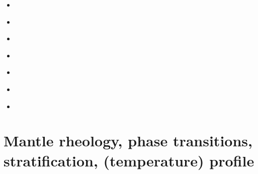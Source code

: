 \begin{scriptsize}
\begin{itemize}
\textcite{zhru15} 
\textcite{wegg15} 
\textcite{bect15} 
\textcite{pesw15} 
\textcite{khfh15} 
\item[\twothousandsixteen]   
\textcite{frbs16}
\textcite{boba16} 
\textcite{wele16} 
\textcite{welm16} 
\textcite{vade16} 
\textcite{chah16} 
\textcite{woso16b} 
\item[\twothousandseventeen] 
\textcite{badw17} 
\textcite{ghts17} 
\textcite{civj17} 
\item[\twothousandeighteen] 
\textcite{guld18} 
\textcite{arcf18} 
\textcite{wele18} 
\item[\twothousandnineteen] 
\textcite{gult19} 
\textcite{mazh19} 
\textcite{cohf19} 
\textcite{lewh19} 
\textcite{ulcw19} 
\textcite{boba19} 
\textcite{fube19} 
\textcite{plju19} 
\item[\twothousandtwenty] 
\textcite{lalt20} 
\textcite{gugb20} 
\textcite{yabt20} 
\textcite{yosy20} 
\textcite{arcf20} 
\textcite{babd20} 
\textcite{lorb20} 
\textcite{loru20} 
\item[\twothousandtwentyone] 
\textcite{lalt21} 
\textcite{khmo21} 
\item[\twothousandtwentytwo] 
\textcite{lids22} 
\end{itemize}
\end{scriptsize}

\section{Mantle rheology, phase transitions, stratification, (temperature) profile}

